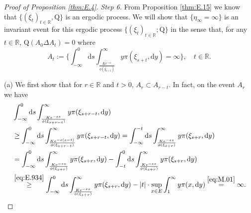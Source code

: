 \documentclass[12pt,a4paper]{amsart}
\numberwithin{equation}{section}
\theoremstyle{plain}
\theoremstyle{definition}
\theoremstyle{remark}
\begin{document}
\begin{proof}[Proof of Proposition \ref{thm:E.4}]
\emph{Step 6.}
	From Proposition \ref{thm:E.15} we know that $\{(\xi_t)_{t\in \mathbb R}, \mathrm Q\}$ is an ergodic process.
	We will show that $\{\eta_\infty = \infty\}$ is an invariant event for this ergodic process $\{(\xi_t)_{t\in \mathbb R}; \mathrm Q\}$ in the sense that, for any $t \in \mathbb R$, $\mathrm Q(A_{0} \Delta A_{t}) = 0$ where
\[
	A_{t}
	:= \Big\{\int_{-\infty}^{0} \mathrm ds \int_{\frac{Ke^{-\epsilon s}}{\phi(\xi_{s+t})}}^\infty y\pi(\xi_{s+t},\mathrm dy) = \infty\Big\}, \quad t\in \mathbb R.
\]
	
(a) We first show that
	for $r\in \mathbb R$ and $t> 0$, $A_r \subset A_{r-t}$.
	In fact,  on the event $A_r$ we have
\begin{align}
	&\int_{-\infty}^0 \mathrm ds \int_{\frac{Ke^{-\epsilon s}}{\phi(\xi_{s+r-t})}}^\infty y\pi(\xi_{s+r-t},\mathrm dy)
	\\&\geq \int_{-\infty}^0 \mathrm ds \int_{\frac{K e^{-\epsilon (s-t)}}{\phi(\xi_{s+r-t})}}^\infty y\pi(\xi_{s+r-t},\mathrm dy)
	= \int_{-\infty}^{-t} \mathrm ds \int_{\frac{K e^{-\epsilon s}}{\phi(\xi_{s+r})}}^\infty y\pi(\xi_{s+r},\mathrm dy)
	\\&= \int_{-\infty}^0 \mathrm ds \int_{\frac{K e^{-\epsilon s}}{\phi(\xi_{s+r})}}^\infty y\pi(\xi_{s+r},\mathrm dy) - \int_{-t}^0 \mathrm ds \int_{\frac{K e^{-\epsilon s}}{\phi(\xi_{s+r})}}^\infty y\pi(\xi_{s+r},\mathrm dy)
	\\&\overset{\eqref{eq:E.934}}\geq \int_{-\infty}^0 \mathrm ds \int_{\frac{K e^{-\epsilon s}}{\phi(\xi_{s+r})}}^\infty y\pi(\xi_{s+r},\mathrm dy) - |t| \cdot \sup_{x\in E} \int_1^\infty y\pi(x,\mathrm dy)
	\overset{\eqref{eq:M.01}}= \infty.
\end{align}


\end{proof}
\end{document}
